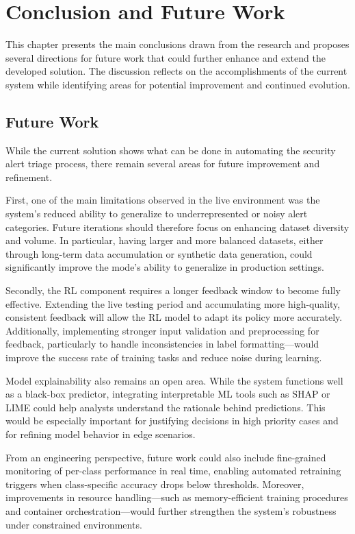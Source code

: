 \chapter{Conclusion and Future Work}
\label{chap:Chapter5}

This chapter presents the main conclusions drawn from the research and proposes several directions for future work that could further enhance and extend the developed solution. 
The discussion reflects on the accomplishments of the current system while identifying areas for potential improvement and continued evolution.

\section{Future Work}

While the current solution shows what can be done in automating the security alert triage process, there remain several areas for future improvement and refinement. 

First, one of the main limitations observed in the live environment was the system's reduced ability to generalize to underrepresented or noisy alert categories. 
Future iterations should therefore focus on enhancing dataset diversity and volume. 
In particular, having larger and more balanced datasets, either through long-term data accumulation or synthetic data generation, could significantly improve the mode's ability to generalize in production settings.

Secondly, the RL component requires a longer feedback window to become fully effective. 
Extending the live testing period and accumulating more high-quality, consistent feedback will allow the RL model to adapt its policy more accurately. 
Additionally, implementing stronger input validation and preprocessing for feedback, particularly to handle inconsistencies in label formatting—would improve the success rate of training tasks and reduce noise during learning.

Model explainability also remains an open area. 
While the system functions well as a black-box predictor, integrating interpretable ML tools such as SHAP or LIME could help analysts understand the rationale behind predictions. 
This would be especially important for justifying decisions in high priority cases and for refining model behavior in edge scenarios.

From an engineering perspective, future work could also include fine-grained monitoring of per-class performance in real time, enabling automated retraining triggers when class-specific accuracy drops below thresholds. 
Moreover, improvements in resource handling—such as memory-efficient training procedures and container orchestration—would further strengthen the system's robustness under constrained environments.


